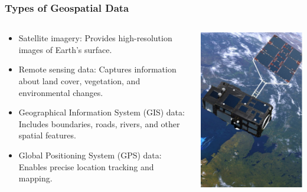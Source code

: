 \documentclass[xcolor=x11names,compress]{beamer}
\renewcommand{\(}{\begin{columns}}
\renewcommand{\)}{\end{columns}}
\newcommand{\<}[1]{\begin{column}{#1}}
\renewcommand{\>}{\end{column}}
\begin{document}
\begin{frame}
    \frametitle{Types of Geospatial Data}
    \begin{columns}[T]
        \begin{column}{0.7\textwidth}
            \begin{itemize}[<+->]
                \item Satellite imagery: Provides high-resolution images of Earth's surface.
                \item Remote sensing data: Captures information about land cover, vegetation, and environmental changes.
                \item Geographical Information System (GIS) data: Includes boundaries, roads, rivers, and other spatial features.
                \item Global Positioning System (GPS) data: Enables precise location tracking and mapping.
            \end{itemize}
        \end{column}
        \begin{column}{0.3\textwidth}
            \includegraphics[width=\textwidth]{Satellite.PNG}
        \end{column}
    \end{columns}
\end{frame}
\end{document}
